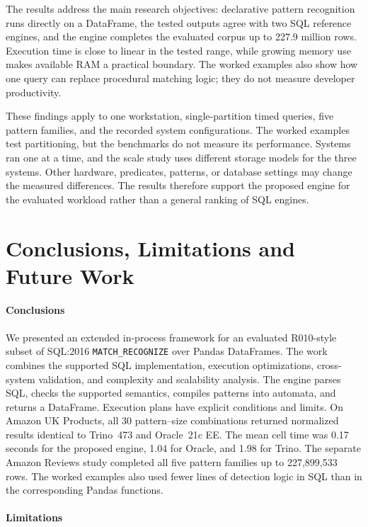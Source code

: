 \documentclass[preprint,12pt,times,a4paper]{elsarticle}
\begin{document}
The results address the main research objectives: declarative pattern
recognition runs directly on a DataFrame, the tested outputs agree with two
SQL reference engines, and the engine completes the evaluated corpus up to
227.9 million rows. Execution time is close to linear in the tested range,
while growing memory use makes available RAM a practical boundary. The
worked examples also show how one query can replace procedural matching
logic; they do not measure developer productivity.

These findings apply to one workstation, single-partition timed queries,
five pattern families, and the recorded system configurations. The worked
examples test partitioning, but the benchmarks do not measure its performance.
Systems ran one at a time, and the scale study uses different storage models
for the three systems. Other hardware, predicates, patterns, or database
settings may change the measured differences. The results therefore support
the proposed engine for the evaluated workload rather than a general ranking
of SQL engines.

\section{Conclusions, Limitations and Future Work}

\paragraph{Conclusions}

We presented an extended in-process framework for an evaluated R010-style
subset of SQL:2016 \texttt{MATCH\_RECOGNIZE} over Pandas DataFrames. The
work combines the supported SQL implementation, execution optimizations,
cross-system validation, and complexity and scalability analysis. The engine
parses SQL, checks the supported semantics, compiles patterns into
automata, and returns a DataFrame. Execution plans have explicit conditions
and limits. On Amazon UK Products, all 30 pattern--size combinations
returned normalized results identical to Trino~473 and Oracle~21c EE. The mean
cell time was 0.17 seconds for the proposed engine, 1.04 for Oracle, and 1.98
for Trino. The separate Amazon Reviews study completed all five pattern
families up to 227,899,533 rows. The worked examples also used fewer lines of
detection logic in SQL than in the corresponding Pandas functions.

\paragraph{Limitations}
\end{document}
